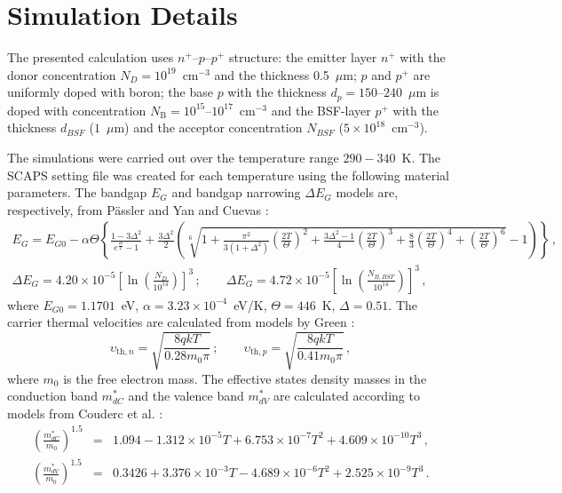 \documentclass[num-refs]{wiley-article} %
\begin{document}
\section{Simulation Details}

The presented calculation uses $n^+$--$p$--$p^+$ structure:
the emitter layer $n^+$ with the donor concentration $N_D=10^{19}$~cm$^{-3}$ and
the thickness 0.5~$\mu$m;
$p$ and $p^+$ are uniformly doped with boron;
the base $p$ with the thickness $d_p=150$--$240$~$\mu$m is doped with concentration
$N_\mathrm{B}=10^{15}$--$10^{17}$~cm$^{-3}$
and the BSF-layer $p^+$ with the thickness $d_{BSF}$ ($1$~$\mu$m) and the acceptor
concentration $N_{BSF}$ ($5\times10^{18}$~cm$^{-3}$).

The simulations  were carried out over the temperature range $290-340$~K.
The SCAPS setting file was created for each temperature using the following material parameters.
The bandgap $E_G$ and bandgap narrowing $\Delta E_G$ models are, respectively, from P\"{a}ssler \cite{Pasler} and Yan and Cuevas \cite{EgNarrow}:
\begin{eqnarray}
\label{eqEg}
E_G=E_{G0}-\alpha\Theta\left\{\frac{1-3\Delta^2}{e^{\frac{\Theta}{T}}-1}
    +\frac{3\Delta^2}{2}\left(\sqrt[6]{1+\frac{\pi^2}{3(1+\Delta^2)}\left(\frac{2T}{\Theta}\right)^2
    +\frac{3\Delta^2-1}{4}\left(\frac{2T}{\Theta}\right)^3+\frac{8}{3}\left(\frac{2T}{\Theta}\right)^4
    +\left(\frac{2T}{\Theta}\right)^6}-1\right)\right\}\,,\\
\Delta E_G=4.20\times10^{-5}\left[\ln\left(\frac{N_{D}}{10^{14}}\right)\right]^3\,;\qquad
     \Delta E_G=4.72\times10^{-5}\left[\ln\left(\frac{N_{B,BSF}}{10^{14}}\right)\right]^3\,,
\end{eqnarray}
where
$E_{G0}=1.1701$~eV,
$\alpha=3.23\times10^{-4}$~eV/K,
$\Theta=446$~K,
$\Delta=0.51$.
The carrier thermal velocities are calculated from models by Green \citep{Nc:Green}:
\begin{equation}
\label{eqVth}
    \upsilon_{\mathrm{th},n}=\sqrt{\frac{8qkT}{0.28m_0\pi}}\,;\qquad
    \upsilon_{\mathrm{th},p}=\sqrt{\frac{8qkT}{0.41m_0\pi}}\,,
\end{equation}
where
$m_0$ is the free electron mass.
The effective states density masses in the conduction band $m^*_{dC}$ and
the valence band $m^*_{dV}$ are calculated according to models from Couderc et al. \citep{Si_ni_Couderc}:
\begin{eqnarray}
  \left(\frac{m^*_{dC}}{m_0}\right)^{1.5} &=& 1.094-1.312\times10^{-5}T+6.753\times10^{-7}T^2+4.609\times10^{-10}T^3\,, \\
  \left(\frac{m^*_{dV}}{m_0}\right)^{1.5} &=& 0.3426+3.376\times10^{-3}T-4.689\times10^{-6}T^2+2.525\times10^{-9}T^3\,.
\end{eqnarray}
\end{document}
